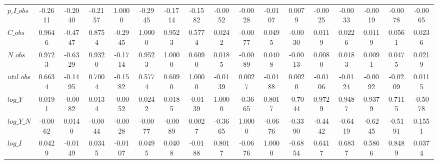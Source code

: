 \begin{center}
\begin{longtable}{lcccccccccccccccc}
$p\_I\_obs       $	 & 	           -0.2611	 & 	           -0.2040	 & 	           -0.2157	 & 	            1.0000	 & 	           -0.2945	 & 	           -0.1714	 & 	           -0.1582	 & 	           -0.0052	 & 	           -0.0028	 & 	           -0.0107	 & 	            0.0079	 & 	           -0.0025	 & 	           -0.0033	 & 	           -0.0019	 & 	           -0.0078	 & 	           -0.0065 \\ 
$C\_obs          $	 & 	            0.9646	 & 	           -0.4747	 & 	            0.8754	 & 	           -0.2945	 & 	            1.0000	 & 	            0.9523	 & 	            0.5774	 & 	            0.0242	 & 	           -0.0077	 & 	            0.0495	 & 	           -0.0030	 & 	            0.0119	 & 	            0.0226	 & 	            0.0119	 & 	            0.0561	 & 	            0.0236 \\ 
$N\_obs          $	 & 	            0.9723	 & 	           -0.6329	 & 	            0.9320	 & 	           -0.1714	 & 	            0.9523	 & 	            1.0000	 & 	            0.6090	 & 	            0.0185	 & 	           -0.0089	 & 	            0.0408	 & 	           -0.0013	 & 	            0.0080	 & 	            0.0183	 & 	            0.0091	 & 	            0.0475	 & 	            0.0219 \\ 
$util\_obs       $	 & 	            0.6634	 & 	           -0.1495	 & 	            0.7004	 & 	           -0.1582	 & 	            0.5774	 & 	            0.6090	 & 	            1.0000	 & 	           -0.0139	 & 	            0.0027	 & 	           -0.0188	 & 	            0.0020	 & 	           -0.0106	 & 	           -0.0124	 & 	           -0.0092	 & 	           -0.0209	 & 	            0.0115 \\ 
$log\_Y          $	 & 	            0.0191	 & 	           -0.0082	 & 	            0.0134	 & 	           -0.0052	 & 	            0.0242	 & 	            0.0185	 & 	           -0.0139	 & 	            1.0000	 & 	           -0.3665	 & 	            0.8017	 & 	           -0.7044	 & 	            0.9729	 & 	            0.9487	 & 	            0.9379	 & 	            0.7115	 & 	           -0.5078 \\ 
$log\_Y\_N       $	 & 	           -0.0062	 & 	            0.0140	 & 	           -0.0044	 & 	           -0.0028	 & 	           -0.0077	 & 	           -0.0089	 & 	            0.0027	 & 	           -0.3665	 & 	            1.0000	 & 	           -0.0676	 & 	           -0.3390	 & 	           -0.4442	 & 	           -0.6419	 & 	           -0.6245	 & 	           -0.5191	 & 	            0.1551 \\ 
$log\_I          $	 & 	            0.0429	 & 	           -0.0149	 & 	            0.0345	 & 	           -0.0107	 & 	            0.0495	 & 	            0.0408	 & 	           -0.0188	 & 	            0.8017	 & 	           -0.0676	 & 	            1.0000	 & 	           -0.6854	 & 	            0.6417	 & 	            0.6837	 & 	            0.5866	 & 	            0.8489	 & 	            0.0374 \\ 

\end{longtable}
\end{center}
